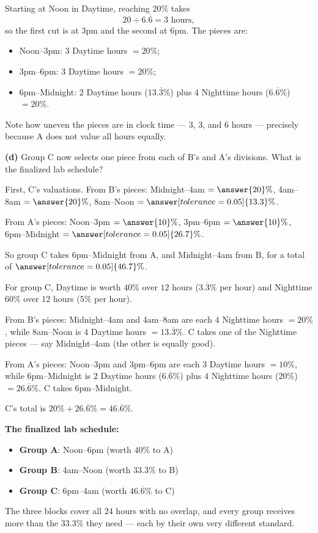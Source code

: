 \documentclass[12pt]{ximera}
\begin{document}
\begin{problem}
\begin{prompt}
\begin{feedback}
Starting at Noon in Daytime, reaching $20\%$ takes
\[ 20 \div 6.\overline{6} = 3 \text{ hours}, \]
so the first cut is at 3pm and the second at 6pm. The pieces are:
\begin{itemize}
\item Noon--3pm: $3$ Daytime hours $= 20\%$;
\item 3pm--6pm: $3$ Daytime hours $= 20\%$;
\item 6pm--Midnight: $2$ Daytime hours ($13.\overline{3}\%$) plus $4$ Nighttime hours
      ($6.\overline{6}\%$) $= 20\%$.
\end{itemize}
Note how uneven the pieces are in clock time --- $3$, $3$, and $6$ hours --- precisely
because A does not value all hours equally.
\end{feedback}
\end{prompt}

\begin{prompt}
\textbf{(d)} Group C now selects one piece from each of B's and A's divisions. What is
the finalized lab schedule?

First, C's valuations. From B's pieces:
Midnight--4am $= \answer{20}\%$, \quad 4am--8am $= \answer{20}\%$, \quad
8am--Noon $= \answer[tolerance=0.05]{13.3}\%$.

\smallskip
From A's pieces: Noon--3pm $= \answer{10}\%$, \quad 3pm--6pm $= \answer{10}\%$, \quad
6pm--Midnight $= \answer[tolerance=0.05]{26.7}\%$.

\smallskip
So group C takes 6pm--Midnight from A, and Midnight--4am from B, for a total of
$\answer[tolerance=0.05]{46.7}\%$.

\begin{feedback}
For group C, Daytime is worth $40\%$ over $12$ hours ($3.\overline{3}\%$ per hour) and
Nighttime $60\%$ over $12$ hours ($5\%$ per hour).

From B's pieces: Midnight--4am and 4am--8am are each $4$ Nighttime hours $= 20\%$,
while 8am--Noon is $4$ Daytime hours $= 13.\overline{3}\%$. C takes one of the
Nighttime pieces --- say Midnight--4am (the other is equally good).

From A's pieces: Noon--3pm and 3pm--6pm are each $3$ Daytime hours $= 10\%$, while
6pm--Midnight is $2$ Daytime hours ($6.\overline{6}\%$) plus $4$ Nighttime hours
($20\%$) $= 26.\overline{6}\%$. C takes 6pm--Midnight.

C's total is $20\% + 26.\overline{6}\% = 46.\overline{6}\%$.

\textbf{The finalized lab schedule:}
\begin{itemize}
\item \textbf{Group A}: Noon--6pm (worth $40\%$ to A)
\item \textbf{Group B}: 4am--Noon (worth $33.\overline{3}\%$ to B)
\item \textbf{Group C}: 6pm--4am (worth $46.\overline{6}\%$ to C)
\end{itemize}
The three blocks cover all $24$ hours with no overlap, and every group receives more
than the $33.3\%$ they need --- each by their own very different standard.
\end{feedback}
\end{prompt}
\end{problem}
\end{document}
